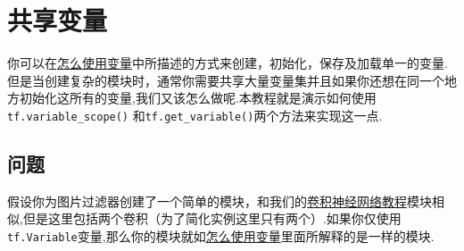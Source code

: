 

\section{共享变量}\label{ux5171ux4eabux53d8ux91cf}

你可以在\href{tensorflow-zh/SOURCE/how_tos/variables/index.md}{怎么使用变量}中所描述的方式来创建，初始化，保存及加载单一的变量.但是当创建复杂的模块时，通常你需要共享大量变量集并且如果你还想在同一个地方初始化这所有的变量,我们又该怎么做呢.本教程就是演示如何使用\texttt{tf.variable\_scope()}
和\texttt{tf.get\_variable()}两个方法来实现这一点.

\subsection{问题}\label{ux95eeux9898}

假设你为图片过滤器创建了一个简单的模块，和我们的\href{tensorflow-zh/SOURCE/tutorials/deep_cnn/index.md}{卷积神经网络教程}模块相似,但是这里包括两个卷积（为了简化实例这里只有两个）.如果你仅使用\texttt{tf.Variable}变量,那么你的模块就如\href{tensorflow-zh/SOURCE/how_tos/variables/index.md}{怎么使用变量}里面所解释的是一样的模块.

\begin{Shaded}
\begin{Highlighting}[]
 
    \OperatorTok{=} \NormalTok{tf.Variable(tf.random_normal([}\NormalTok{, }\NormalTok{, }\NormalTok{, }\NormalTok{]),}
        \OperatorTok{=}\NormalTok{)}
    \OperatorTok{=} \NormalTok{tf.Variable(tf.zeros([}\NormalTok{]), name}\OperatorTok{=}\NormalTok{)}
    \OperatorTok{=} 
        \OperatorTok{=}\NormalTok{[}\NormalTok{, }\NormalTok{, }\NormalTok{, }\NormalTok{], padding}\OperatorTok{=}\NormalTok{)}
    \OperatorTok{=} \OperatorTok{+} 

    \OperatorTok{=} \NormalTok{tf.Variable(tf.random_normal([}\NormalTok{, }\NormalTok{, }\NormalTok{, }\NormalTok{]),}
        \OperatorTok{=}\NormalTok{)}
    \OperatorTok{=} \NormalTok{tf.Variable(tf.zeros([}\NormalTok{]), name}\OperatorTok{=}\NormalTok{)}
    \OperatorTok{=} 
        \OperatorTok{=}\NormalTok{[}\NormalTok{, }\NormalTok{, }\NormalTok{, }\NormalTok{], padding}\OperatorTok{=}\NormalTok{)}
     \OperatorTok{+} 
\end{Highlighting}
\end{Shaded}

